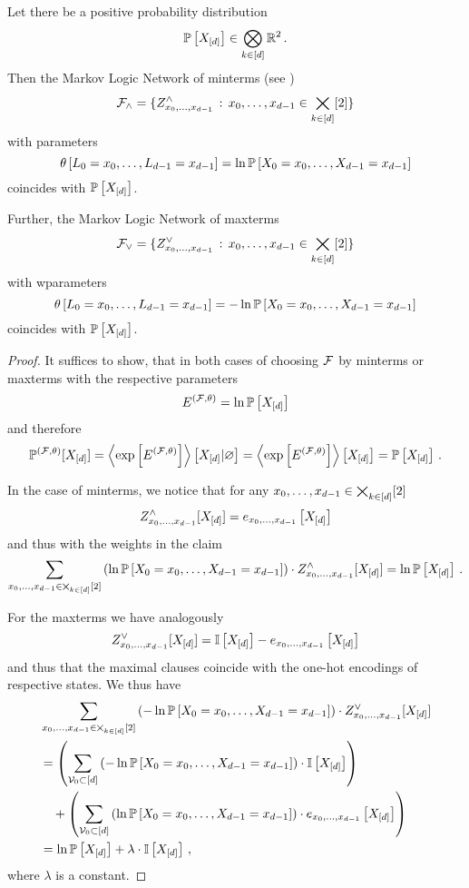 \begin{theorem}\label{the:maximalClausesRepresentation}\label{the:mintermExpressivityMLN}
	Let there be a positive probability distribution
		 \[ \mathbb{P}\left[X_{[d]}\right] \in \bigotimes_{k\in[d]}\mathbb{R}^2 \, . \]
	Then the Markov Logic Network of minterms (see )
		\[ \mathcal{F}_{\land} = \{Z^{\land}_{{x_{0},\ldots,x_{d-1}}} \, : \, {x_{0},\ldots,x_{d-1}}\in\bigtimes_{k\in[d]}[2] \}\]
	with parameters %
		\[ \canparamat{\selvariableof{0}=\catindexof{0},\ldots,\selvariableof{\atomorder-1}=\catindexof{\atomorder-1}}%
		= \ln \probat{\indexedcatvariables} \]
	coincides with $\mathbb{P}\left[X_{[d]}\right]$.

	Further, the Markov Logic Network of maxterms
		\[ \mathcal{F}_{\lor} = \{Z^{\lor}_{{x_{0},\ldots,x_{d-1}}} \, : \, {x_{0},\ldots,x_{d-1}}\in\bigtimes_{k\in[d]}[2] \}\]
	with wparameters
		\[ \canparamat{\selvariableof{0}=\catindexof{0},\ldots,\selvariableof{\atomorder-1}=\catindexof{\atomorder-1}} %
		= - \ln\probat{\indexedcatvariables} \]
	coincides with $\mathbb{P}\left[X_{[d]}\right]$.
\end{theorem}
\begin{proof}
	It suffices to show, that in both cases of choosing $\mathcal{F}$ by minterms or maxterms with the respective parameters
		\[ E^{(\mathcal{F},\theta)} =  \ln\mathbb{P}\left[X_{[d]}\right] \]
	and therefore
		\[ \mathbb{P}^{(\mathcal{F},\theta)}[X_{[d]}] 
		= \left\langle \mathrm{exp}\left[E^{(\mathcal{F},\theta)}\right]\right\rangle \left[ X_{[d]} | \varnothing \right] 
		=  \left\langle \mathrm{exp}\left[E^{(\mathcal{F},\theta)}\right]\right\rangle \left[ X_{[d]} \right] 
		= \mathbb{P}\left[X_{[d]}\right]\, . \]
	
	In the case of minterms, we notice that for any ${x_{0},\ldots,x_{d-1}}\in\bigtimes_{k\in[d]}[2]$
		\[ Z^{\land}_{{x_{0},\ldots,x_{d-1}}}[X_{[d]}] = e_{{x_{0},\ldots,x_{d-1}}}\left[X_{[d]}\right] \]
	and thus with the weights in the claim
		\[ \sum_{{x_{0},\ldots,x_{d-1}}\in\bigtimes_{k\in[d]}[2]} 
		\left( \ln \mathbb{P}\left[X_{0}=x_{0},\ldots,X_{d-1}=x_{d-1}\right] \right) \cdot Z^{\land}_{{x_{0},\ldots,x_{d-1}}}[X_{[d]}]
		= \ln\mathbb{P}\left[X_{[d]}\right] \, .
		 \]

	For the maxterms we have analogously
		\[ Z^{\lor}_{{x_{0},\ldots,x_{d-1}}}[X_{[d]}] = \mathbb{I}\left[X_{[d]}\right] - e_{x_{0},\ldots,x_{d-1}}\left[X_{[d]}\right] \]
	and thus that the maximal clauses coincide with the one-hot encodings of respective states.
	We thus have
	\begin{align*}
		& \sum_{{x_{0},\ldots,x_{d-1}}\in\bigtimes_{k\in[d]}[2]} 
		\left( - \ln \mathbb{P}\left[X_{0}=x_{0},\ldots,X_{d-1}=x_{d-1}\right] \right) \cdot Z^{\lor}_{{x_{0},\ldots,x_{d-1}}}[X_{[d]}] \\
		& =
		\left(  \sum_{\mathcal{V}_0\subset [d]} 
		\left( - \ln \mathbb{P}\left[X_{0}=x_{0},\ldots,X_{d-1}=x_{d-1}\right] \right) \cdot \mathbb{I}\left[X_{[d]}\right] \right) \\
		& \quad + 
		\left(  \sum_{\mathcal{V}_0\subset [d]} 
		\left(  \ln \mathbb{P}\left[X_{0}=x_{0},\ldots,X_{d-1}=x_{d-1}\right] \right) \cdot
		e_{x_{0},\ldots,x_{d-1}}\left[X_{[d]}\right] 
		\right) 
		 \\
		 & = \ln\mathbb{P}\left[X_{[d]}\right] + \lambda \cdot  \mathbb{I}\left[X_{[d]}\right]\,,
	\end{align*}
	where $\lambda$ is a constant.
\end{proof}

